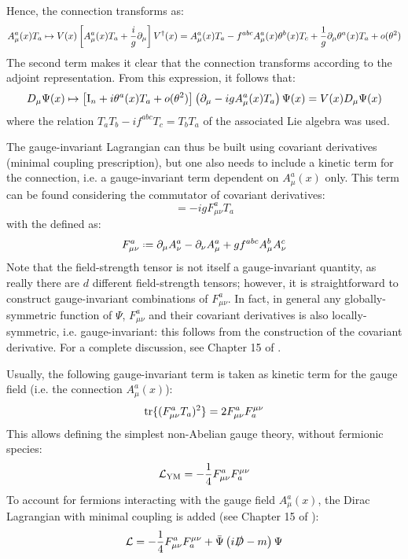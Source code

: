 Hence, the connection transforms as:
\begin{equation*}
  A_\mu^a(x) T_a \mapsto V(x) \left[ A_\mu^a(x) T_a + \frac{i}{g} \partial_\mu \right] V^\dagger(x) = A_\mu^a(x) T_a - f^{abc} A_\mu^a(x) \theta^b(x) T_c + \frac{1}{g} \partial_\mu \theta^a(x) T_a + o(\theta^2)
\end{equation*}
The second term makes it clear that the connection transforms according to the adjoint representation. From this expression, it follows that:
\begin{equation*}
  D_\mu \Psi(x) \mapsto \left[ \mathrm{I}_n + i \theta^a(x) T_a + o(\theta^2) \right] \left( \partial_\mu - i g A_\mu^a(x) T_a \right) \Psi(x) = V(x) D_\mu \Psi(x)
\end{equation*}
where the relation $ T_a T_b - i f^{abc} T_c = T_b T_a $ of the associated Lie algebra was used.

The gauge-invariant Lagrangian can thus be built using covariant derivatives (minimal coupling prescription), but one also needs to include a kinetic term for the connection, i.e. a gauge-invariant term dependent on $ A_\mu^a(x) $ only. This term can be found considering the commutator of covariant derivatives:
\begin{equation}
  [D_\mu , D_\nu] = - i g F_{\mu \nu}^a T_a
\end{equation}
with the  defined as:
\begin{equation}
  F_{\mu \nu}^a \defeq \pa_\mu A_\nu^a - \pa_\nu A_\mu^a + g f^{abc} A_\mu^b A_\nu^c
  \label{eq:field-str}
\end{equation}
Note that the field-strength tensor is not itself a gauge-invariant quantity, as really there are $ d $ different field-strength tensors; however, it is straightforward to construct gauge-invariant combinations of $ F_{\mu \nu}^a $. In fact, in general any globally-symmetric function of $ \Psi $, $ F_{\mu \nu}^a $ and their covariant derivatives is also locally-symmetric, i.e. gauge-invariant: this follows from the construction of the covariant derivative. For a complete discussion, see Chapter 15 of \cite{Peskin-1995}.

Usually, the following gauge-invariant term is taken as kinetic term for the gauge field (i.e. the connection $ A_\mu^a(x) $):
\begin{equation}
  \operatorname{tr} \{(F_{\mu \nu}^a T_a)^2\} = 2 F_{\mu \nu}^a F^{\mu \nu}_a
\end{equation}
This allows defining the simplest non-Abelian gauge theory,  without fermionic species:
\begin{equation}
  \mathcal{L}_\text{YM} = - \frac{1}{4} F_{\mu \nu}^a F^{\mu \nu}_a
\end{equation}
To account for fermions interacting with the gauge field $ A_\mu^a(x) $, the Dirac Lagrangian with minimal coupling is added (see Chapter 15 of \cite{Weinberg-1996}):
\begin{equation}
  \mathcal{L} = - \frac{1}{4} F_{\mu \nu}^a F^{\mu \nu}_a + \bar{\Psi} \left( i \slashed{D} - m \right) \Psi
  \label{eq:qcd-lag}
\end{equation}

